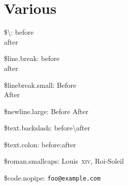 \documentclass[ebook,demo]{pyscribe}
\begin{document}
\section{Various}

\par\$\textbackslash{}: before \\ after
\par\$line.break: before \\ after
\par\$linebreak.small: Before \\ After
\par\$newline.large: Before  After

\par\$text.backslash: before\textbackslash{}after
\par\$text.colon: before\string:after
\par\$roman.smallcaps: Louis~\textsc{xiv}, Roi-Soleil
\par\$code.nopipe: \verb|foo@example.com|
\end{document}
